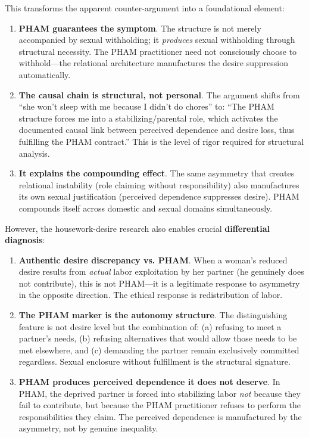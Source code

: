 \documentclass[12pt,openany]{book}
\numberwithin{equation}{chapter}
\begin{document}
This transforms the apparent counter-argument into a foundational element:

\begin{enumerate}
    \item \textbf{PHAM guarantees the symptom}. The structure is not merely accompanied by sexual withholding; it \textit{produces} sexual withholding through structural necessity. The PHAM practitioner need not consciously choose to withhold---the relational architecture manufactures the desire suppression automatically.
    
    \item \textbf{The causal chain is structural, not personal}. The argument shifts from ``she won't sleep with me because I didn't do chores'' to: ``The PHAM structure forces me into a stabilizing/parental role, which activates the documented causal link between perceived dependence and desire loss, thus fulfilling the PHAM contract.'' This is the level of rigor required for structural analysis.
    
    \item \textbf{It explains the compounding effect}. The same asymmetry that creates relational instability (role claiming without responsibility) also manufactures its own sexual justification (perceived dependence suppresses desire). PHAM compounds itself across domestic and sexual domains simultaneously.
\end{enumerate}

However, the housework-desire research also enables crucial \textbf{differential diagnosis}:

\begin{enumerate}
    \item \textbf{Authentic desire discrepancy vs. PHAM}. When a woman's reduced desire results from \textit{actual} labor exploitation by her partner (he genuinely does not contribute), this is not PHAM---it is a legitimate response to asymmetry in the opposite direction. The ethical response is redistribution of labor.
    
    \item \textbf{The PHAM marker is the autonomy structure}. The distinguishing feature is not desire level but the combination of: (a) refusing to meet a partner's needs, (b) refusing alternatives that would allow those needs to be met elsewhere, and (c) demanding the partner remain exclusively committed regardless. Sexual enclosure without fulfillment is the structural signature.
    
    \item \textbf{PHAM produces perceived dependence it does not deserve}. In PHAM, the deprived partner is forced into stabilizing labor \textit{not} because they fail to contribute, but because the PHAM practitioner refuses to perform the responsibilities they claim. The perceived dependence is manufactured by the asymmetry, not by genuine inequality.
\end{enumerate}
\end{document}
